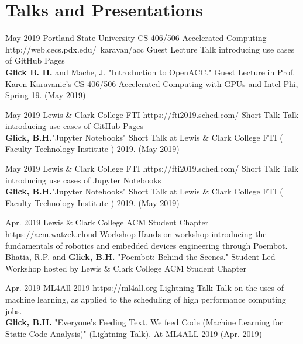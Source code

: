 \documentclass[10pt]{article} %
\begin{document}


\section{Talks and Presentations}

\award
{May 2019}
{}
{Portland State University CS 406/506 Accelerated Computing}
{http://web.cecs.pdx.edu/~karavan/acc}
{Guest Lecture}
{Talk introducing use cases of GitHub Pages \\ \textbf{Glick B. H.} and Mache, J. "Introduction to OpenACC." Guest Lecture in Prof. Karen Karavanic's CS 406/506 Accelerated Computing with GPUs and Intel Phi, Spring 19. (May 2019)}

\award
{May 2019}
{}
{Lewis \& Clark College FTI}
{https://fti2019.sched.com/}
{Short Talk}
{Talk introducing use cases of GitHub Pages \\ \textbf{Glick, B.H.}"Jupyter Notebooks" Short Talk at Lewis \& Clark College FTI ( Faculty Technology Institute ) 2019. (May 2019)}

\award
{May 2019}
{}
{Lewis \& Clark College FTI}
{https://fti2019.sched.com/}
{Short Talk}
{Talk introducing use cases of Jupyter Notebooks \\ \textbf{Glick, B.H.}"Jupyter Notebooks" Short Talk at Lewis \& Clark College FTI ( Faculty Technology Institute ) 2019. (May 2019)}


\award
{Apr. 2019}
{ }
{Lewis \& Clark College ACM Student Chapter}
{https://acm.watzek.cloud}
{Workshop}
{Hands-on workshop introducing the fundamentals of robotics and embedded devices engineering through Poembot. \\ Bhatia, R.P. and \textbf{Glick, B.H.}  "Poembot: Behind the Scenes." Student Led Workshop hosted by Lewis \& Clark College ACM Student Chapter}

\award
{Apr. 2019}
{}
{ML4All 2019}
{https://ml4all.org}
{Lightning Talk}
{Talk on the uses of machine learning, as applied to the scheduling of high performance computing jobs. \\  \textbf{Glick, B.H.} "Everyone's Feeding Text. We feed Code (Machine Learning for Static Code Analysis)" (Lightning Talk). At ML4ALL 2019 (Apr. 2019)}
\end{document}

